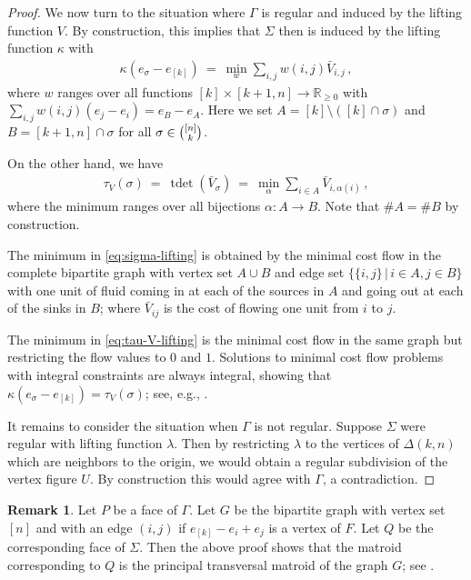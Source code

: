 \documentclass[11pt,a4paper]{amsart}
\newcommand{\RR}{{\mathbb{R}}}
\newcommand{\smallSetOf}[2]{\{#1\,|\,#2\}}
\newcommand{\Hypersimplex}[2]{{\Delta(#1,#2)}}
\DeclareMathOperator{\tdet}{tdet}
\theoremstyle{plain}
\theoremstyle{definition}
\newtheorem{remark}[theorem]{Remark}
\begin{document}
\begin{proof}
  We now turn to the situation where $\Gamma$ is regular and induced by the lifting function $V$.
  By construction, this implies that $\Sigma$ then is induced by the lifting function $\kappa$ with
  \begin{align}
    \label{eq:sigma-lifting}
    \kappa(e_\sigma-e_{[k]}) \ = \ \min_w \sum_{i,j} w(i,j) \bar V_{i,j}\,,
  \end{align}
  where $w$ ranges over all functions $[k] \times [k+1,n] \to \RR_{\geq 0}$ with $\sum_{i,j}
  w(i,j)(e_j-e_i) = e_B - e_A$. Here we set $A = [k] \setminus ([k] \cap \sigma)$ and $B = [k+1,n]
  \cap \sigma$ for all $\sigma\in\tbinom{[n]}{k}$.

  On the other hand, we have
  \begin{align}
    \label{eq:tau-V-lifting}
    \tau_V(\sigma) \ = \ \tdet(\bar V_\sigma) \ = \ \min_\alpha \sum_{i\in A} \bar V_{i,\alpha(i)}\,,
  \end{align}
  where the minimum ranges over all bijections $\alpha: A\to B$.  Note that $\#A=\#B$ by
  construction.

  The minimum in \eqref{eq:sigma-lifting} is obtained by the minimal cost flow in the complete
  bipartite graph with vertex set $A\cup B$ and edge set $\smallSetOf{\{i,j\}}{i\in A,j\in B}$ with
  one unit of fluid coming in at each of the sources in $A$ and going out at each of the sinks in $B$;
  where $\bar V_{ij}$ is the cost of flowing one unit from $i$ to $j$.

  The minimum in \eqref{eq:tau-V-lifting} is the minimal cost flow in the same graph but restricting
  the flow values to $0$ and $1$.  Solutions to minimal cost flow problems with integral constraints
  are always integral, showing that $\kappa(e_\sigma-e_{[k]})=\tau_V(\sigma)$; see, e.g.,
  \cite[\S10.2]{Schrijver03}.

  It remains to consider the situation when $\Gamma$ is not regular.  Suppose $\Sigma$ were regular
  with lifting function $\lambda$.  Then by restricting $\lambda$ to the vertices of
  $\Hypersimplex{k}{n}$ which are neighbors to the origin, we would obtain a regular subdivision of
  the vertex figure $U$.  By construction this would agree with $\Gamma$, a contradiction.
\end{proof}

\begin{remark}
  Let $P$ be a face of $\Gamma$. Let $G$ be the bipartite graph with vertex set $[n]$ and with an
  edge $(i,j)$ if $e_{[k]} - e_i + e_j$ is a vertex of $F$.  Let $Q$ be the corresponding face of
  $\Sigma$. Then the above proof shows that the matroid corresponding to $Q$ is the principal
  transversal matroid of the graph $G$; see \cite{Transversal}.
\end{remark}
\end{document}

